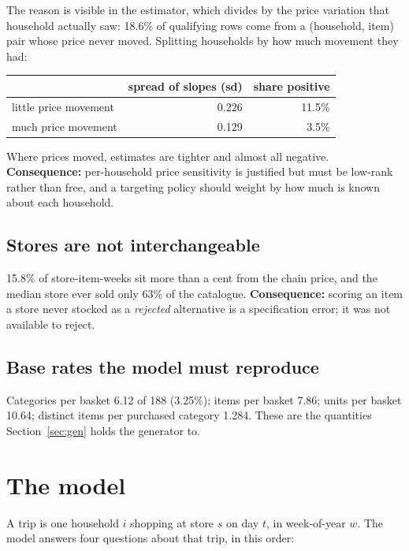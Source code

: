 \documentclass[11pt]{article}
\begin{document}
The reason is visible in the estimator, which divides by the price variation that
household actually saw: 18.6\% of qualifying rows come from a (household, item) pair
whose price never moved. Splitting households by how much movement they had:

\begin{center}
\begin{tabular}{lrr}
\toprule
 & spread of slopes (sd) & share positive \\
\midrule
little price movement & 0.226 & 11.5\% \\
much price movement & 0.129 & 3.5\% \\
\bottomrule
\end{tabular}
\end{center}

Where prices moved, estimates are tighter and almost all negative. \textbf{Consequence:}
per-household price sensitivity is justified but must be low-rank rather than free, and a
targeting policy should weight by how much is known about each household.

\subsection{Stores are not interchangeable}

15.8\% of store-item-weeks sit more than a cent from the chain price, and the
median store ever sold only 63\% of the catalogue. \textbf{Consequence:} scoring
an item a store never stocked as a \emph{rejected} alternative is a specification error;
it was not available to reject.

\subsection{Base rates the model must reproduce}

Categories per basket 6.12 of 188 (3.25\%); items per basket 7.86;
units per basket 10.64; distinct items per purchased category 1.284. These are
the quantities Section~\ref{sec:gen} holds the generator to.

\section{The model}
\label{sec:model}

A trip is one household $i$ shopping at store $s$ on day $t$, in week-of-year $w$. The
model answers four questions about that trip, in this order:
\end{document}
